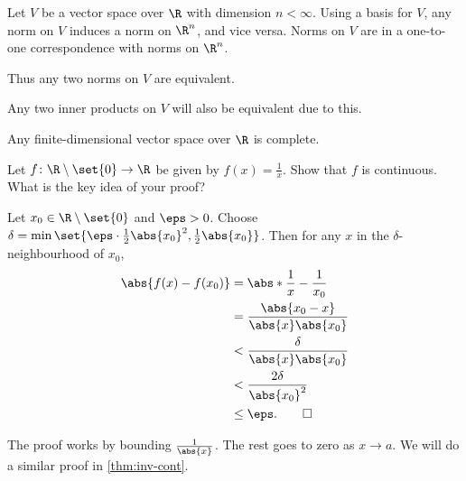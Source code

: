 \begin{remarks}
    \item Let $V$ be a vector space over $\R$ with dimension $n < \infty$.
    Using a basis for $V$, any norm on $V$ induces a norm on $\R^n$,
    and vice versa.
    Norms on $V$ are in a one-to-one correspondence with norms on $\R^n$.
    \item Thus any two norms on $V$ are equivalent.
    \item Any two inner products on $V$ will also be equivalent due to this.
    \item Any finite-dimensional vector space over $\R$ is complete.
\end{remarks}

\begin{exercise} \label{thm:reciprocal-cont}
    Let $f\colon \R \setminus \set{0} \to \R$ be given by $f(x) = \frac1x$.
    Show that $f$ is continuous.
    What is the key idea of your proof?
\end{exercise}
\begin{solution}
    Let $x_0 \in \R \setminus \set{0}$ and $\eps > 0$.
    Choose $\delta
    = \min\set{\eps \cdot \frac12\abs{x_0}^2, \frac12 \abs{x_0}}$.
    Then for any $x$ in the $\delta$-neighbourhood of $x_0$, \begin{align*}
        \abs{f(x) - f(x_0)}
            &= \abs*{\frac1x - \frac1{x_0}} \\
            &= \frac{\abs{x_0 - x}}{\abs{x} \abs{x_0}} \\
            &< \frac{\delta}{\abs{x} \abs{x_0}} \\
            &< \frac{2\delta}{\abs{x_0}^2} \\
            &\le \eps. \qedhere
    \end{align*}
\end{solution}
\begin{remark}
    The proof works by bounding $\frac1{\abs{x}}$.
    The rest goes to zero as $x \to a$.
    We will do a similar proof in \cref{thm:inv-cont}.
\end{remark}
